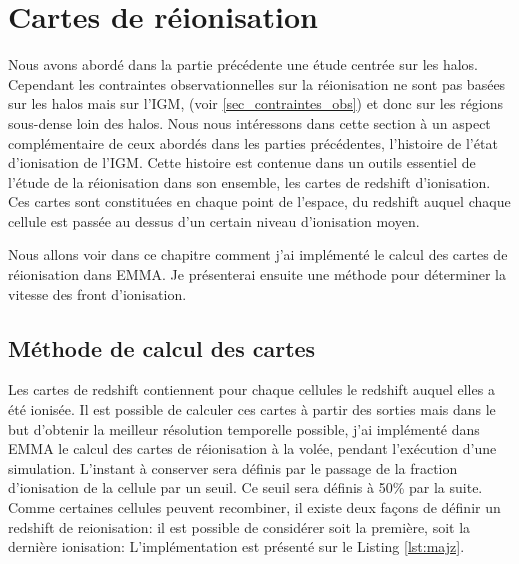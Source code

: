 \chapter{Cartes de réionisation}

Nous avons abordé dans la partie précédente une étude centrée sur les halos.
Cependant les contraintes observationnelles sur la réionisation ne sont pas basées sur les halos mais sur l'\ac{IGM}, (voir \ref{sec_contraintes_obs}) et donc sur les régions sous-dense loin des halos.
Nous nous intéressons dans cette section à un aspect complémentaire de ceux abordés dans les parties précédentes, l'histoire de l'état d'ionisation de l'\ac{IGM}.
Cette histoire est contenue dans un outils essentiel de l'étude de la réionisation dans son ensemble, les cartes de redshift d'ionisation.
Ces cartes sont constituées en chaque point de l'espace, du redshift auquel chaque cellule est passée au dessus d'un certain niveau d'ionisation moyen.

Nous allons voir dans ce chapitre comment j'ai implémenté le calcul des cartes de réionisation dans EMMA.
Je présenterai ensuite une méthode pour déterminer la vitesse des front d’ionisation.


\section{Méthode de calcul des cartes}

Les cartes de redshift contiennent pour chaque cellules le redshift auquel elles a été ionisée.
Il est possible de calculer ces cartes à partir des sorties mais dans le but d'obtenir la meilleur résolution temporelle possible, j'ai implémenté dans EMMA le calcul des cartes de réionisation à la volée, pendant l'exécution d'une simulation.
L'instant à conserver sera définis par le passage de la fraction d'ionisation de la cellule par un seuil.
Ce seuil sera définis à  50\% par la suite.
Comme certaines cellules peuvent recombiner, il existe deux façons de définir un redshift de reionisation: il est possible de considérer soit la première, soit la dernière ionisation:
L'implémentation est présenté sur le Listing \ref{lst:majz}.

